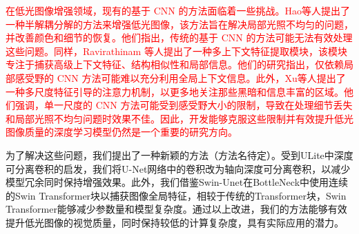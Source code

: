 \documentclass[a4paper, 10pt]{article}
\begin{document}
		\textcolor{red}{在低光图像增强领域，现有的基于 CNN 的方法面临着一些挑战。Hao等人\cite{hao2020low}提出了一种半解耦分解的方法来增强低光图像，该方法旨在解决局部光照不均匀的问题，并改善颜色和细节的恢复。他们指出，传统的基于 CNN 的方法可能无法有效处理这些问题。同样，Ravirathinam 等人\cite{ravirathinam2021c}提出了一种多上下文特征提取模块，该模块专注于捕获高级上下文特征、结构相似性和局部信息。他们的研究指出，仅依赖局部感受野的 CNN 方法可能难以充分利用全局上下文信息。此外，Xu等人\cite{xu2021novel}提出了一种多尺度特征引导的注意力机制，以更多地关注那些黑暗和信息丰富的区域。他们强调，单一尺度的 CNN 方法可能受到感受野大小的限制，导致在处理细节丢失和局部光照不均匀问题时效果不佳。因此，开发能够克服这些限制并有效提升低光图像质量的深度学习模型仍然是一个重要的研究方向。}
		
%		
%		
%		
%		


%		
		
		为了解决这些问题，我们提出了一种新颖的方法（方法名待定）。受到ULite\cite{dinh20231m}中深度可分离卷积的启发，我们将U-Net网络中的卷积改为轴向深度可分离卷积，以减少模型冗余同时保持增强效果。此外，我们借鉴Swin-Unet\cite{cao2022swin}在BottleNeck中使用连续的Swin Transformer块以捕获图像全局特征，相较于传统的Transformer块，Swin Transformer能够减少参数量和模型复杂度。通过以上改进，我们的方法能够有效提升低光图像的视觉质量，同时保持较低的计算复杂度，具有实际应用的潜力。
		
\end{document}
